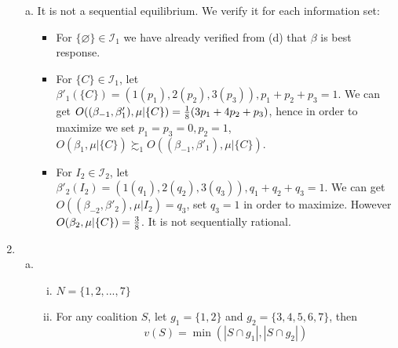 \documentclass[a4paper,12pt]{article}
\begin{document}
\begin{enumerate}
\begin{enumerate}[(a)]
\item
It is not a sequential equilibrium. We verify it for each information set:
    \begin{itemize}
    \item For $\{\varnothing\}\in \mathcal {I}_1$ we have already verified from (d) that $\beta$ is best response.
    \item For $\{C\} \in \mathcal {I}_1$, let $\beta'_1(\{C\})=(1(p_1),2(p_2),3(p_3)), p_1+p_2+p_3=1$.
            We can get $O((\beta_{-1},\beta'_1),\mu | \{C\})={1\over8}(3p_1+4p_2+p_3)$,
            hence in order to maximize we set $p_1=p_3=0,p_2=1$, $O(\beta_1,\mu | \{C\}) \succsim_1 O((\beta_{-1},\beta'_1),\mu | \{C\})$.
    \item For $I_2 \in \mathcal {I}_2$, let $\beta'_2(I_2)=(1(q_1),2(q_2),3(q_3)), q_1+q_2+q_3=1$.
            We can get $O((\beta_{-2},\beta'_2),\mu | I_2)=q_3$, set $q_3=1$ in order to maximize.
            However $O(\beta_2,\mu | \{C\})={3\over8}$. It is not sequentially rational.
    \end{itemize}

\end{enumerate}

\item
\begin{enumerate}[(a)]
  \item
  \begin{enumerate}[i.]
    \item $N=\{1,2,...,7\}$
    \item
    For any coalition $S$, let $g_1=\{1,2\}$ and $g_2=\{3,4,5,6,7\}$, then
    \begin{displaymath}
        v(S) = \min (|S\cap g_1|,|S \cap g_2|)
    \end{displaymath}
  \end{enumerate}


\end{enumerate}
\end{enumerate}
\end{document}
